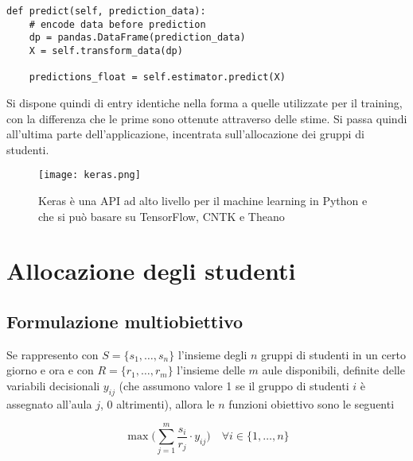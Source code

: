 \begin{verbatim}
def predict(self, prediction_data):
    # encode data before prediction
    dp = pandas.DataFrame(prediction_data)
    X = self.transform_data(dp)

    predictions_float = self.estimator.predict(X)
\end{verbatim} 

Si dispone quindi di entry identiche nella forma a quelle utilizzate per il training, con la 
differenza che le prime sono ottenute attraverso delle stime. Si passa quindi all'ultima parte 
dell'applicazione, incentrata sull'allocazione dei gruppi di studenti. 

\begin{figure}
    \begin{small}
        \begin{center}
            \texttt{[image: keras.png]}
        \end{center}
        \caption{Keras è una API ad alto livello per il machine learning in Python
            e che si può basare su TensorFlow, CNTK e Theano \cite{keras}}
        \label{fig:}
    \end{small}
\end{figure}

\newpage

\section{Allocazione degli studenti}
\label{section:methods_allocation}

\subsection{Formulazione multiobiettivo}
\label{section:allocation_formulation}

Se rappresento con $S = \{s_1, \dots, s_n\}$ l'insieme degli $n$  gruppi di studenti in un certo giorno e ora e con 
$R = \{r_1, \dots, r_m\}$ l'insieme
delle $m$  aule disponibili, definite delle variabili decisionali $y_{ij}$ (che assumono valore 1 se il 
gruppo di studenti $i$ è assegnato all'aula $j$, 0 altrimenti), allora le $n$  funzioni obiettivo 
sono le seguenti 

\begin{equation}
    \max \bigg( \sum_{j = 1}^{m}\frac{s_i}{r_j} \cdot y_{ij} \bigg) \quad \forall i \in \{1, \dots, n\}
    \label{eq:objs}
\end{equation}


